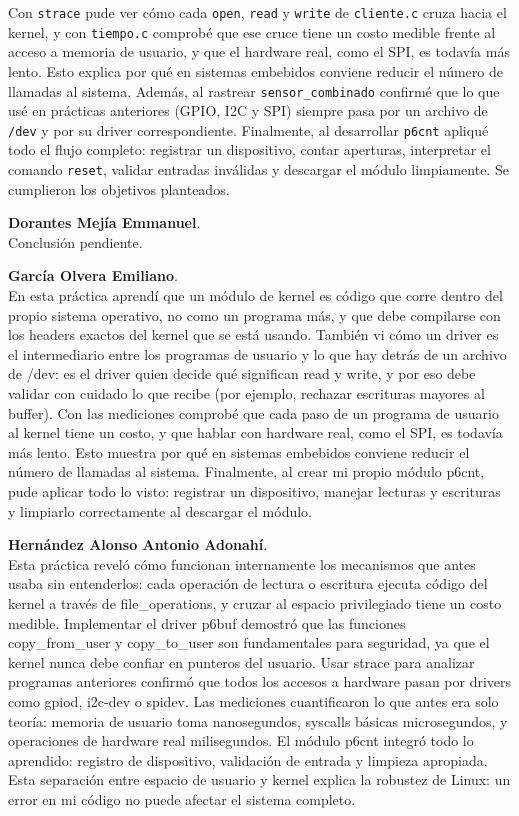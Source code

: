 \documentclass[conference]{IEEEtran}
\begin{document}
Con \texttt{strace} pude ver cómo cada \texttt{open}, \texttt{read} y \texttt{write} de \texttt{cliente.c} cruza hacia el kernel, y con \texttt{tiempo.c} comprobé que ese cruce tiene un costo medible frente al acceso a memoria de usuario, y que el hardware real, como el SPI, es todavía más lento. Esto explica por qué en sistemas embebidos conviene reducir el número de llamadas al sistema. Además, al rastrear \texttt{sensor\_combinado} confirmé que lo que usé en prácticas anteriores (GPIO, I2C y SPI) siempre pasa por un archivo de \texttt{/dev} y por su driver correspondiente. Finalmente, al desarrollar \texttt{p6cnt} apliqué todo el flujo completo: registrar un dispositivo, contar aperturas, interpretar el comando \texttt{reset}, validar entradas inválidas y descargar el módulo limpiamente. Se cumplieron los objetivos planteados.

\textbf{Dorantes Mejía Emmanuel}. \\
Conclusión pendiente.

\textbf{García Olvera Emiliano}. \\
En esta práctica aprendí que un módulo de kernel es código que corre dentro del propio sistema operativo, no como un programa más, y que debe compilarse con los headers exactos del kernel que se está usando. También vi cómo un driver es el intermediario entre los programas de usuario y lo que hay detrás de un archivo de /dev: es el driver quien decide qué significan read y write, y por eso debe validar con cuidado lo que recibe (por ejemplo, rechazar escrituras mayores al buffer).
Con las mediciones comprobé que cada paso de un programa de usuario al kernel tiene un costo, y que hablar con hardware real, como el SPI, es todavía más lento. Esto muestra por qué en sistemas embebidos conviene reducir el número de llamadas al sistema. Finalmente, al crear mi propio módulo p6cnt, pude aplicar todo lo visto: registrar un dispositivo, manejar lecturas y escrituras y limpiarlo correctamente al descargar el módulo.

\textbf{Hernández Alonso Antonio Adonahí}. \\
Esta práctica reveló cómo funcionan internamente los mecanismos que antes usaba sin entenderlos: cada operación de lectura o escritura ejecuta código del kernel a través de file\_operations, y cruzar al espacio privilegiado tiene un costo medible. Implementar el driver p6buf demostró que las funciones copy\_from\_user y copy\_to\_user son fundamentales para seguridad, ya que el kernel nunca debe confiar en punteros del usuario. Usar strace para analizar programas anteriores confirmó que todos los accesos a hardware pasan por drivers como gpiod, i2c-dev o spidev. Las mediciones cuantificaron lo que antes era solo teoría: memoria de usuario toma nanosegundos, syscalls básicas microsegundos, y operaciones de hardware real milisegundos. El módulo p6cnt integró todo lo aprendido: registro de dispositivo, validación de entrada y limpieza apropiada. Esta separación entre espacio de usuario y kernel explica la robustez de Linux: un error en mi código no puede afectar el sistema completo.
\end{document}
